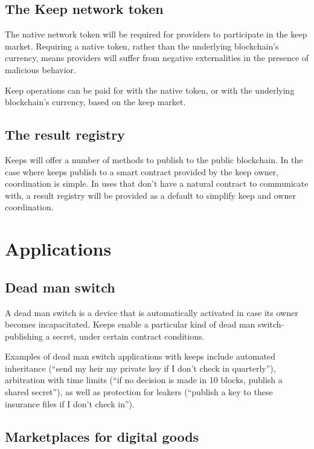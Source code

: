 \documentclass[11pt]{article}
\begin{document}
\subsection{The Keep network token}

The native network token will be required for providers to participate
in the keep market. Requiring a native token, rather than the
underlying blockchain’s currency, means providers will suffer from
negative externalities in the presence of malicious behavior.

Keep operations can be paid for with the native token, or with the
underlying blockchain’s currency, based on the keep market.

\subsection{The result registry}

Keeps will offer a number of methods to publish to the public
blockchain. In the case where keeps publish to a smart contract
provided by the keep owner, coordination is simple. In uses that don’t
have a natural contract to communicate with, a result registry will be
provided as a default to simplify keep and owner coordination.

\section{Applications}

\subsection{Dead man switch}

A dead man switch is a device that is automatically activated in case
its owner becomes incapacitated. Keeps enable a particular kind of
dead man switch- publishing a secret, under certain contract
conditions.

Examples of dead man switch applications with keeps include automated
inheritance (“send my heir my private key if I don’t check in quarterly”),
arbitration with time limits (“if no decision is made in 10 blocks, publish a
shared secret”), as well as protection for leakers (“publish a key to these
insurance files if I don’t check in”).

\subsection{Marketplaces for digital goods}
\end{document}
